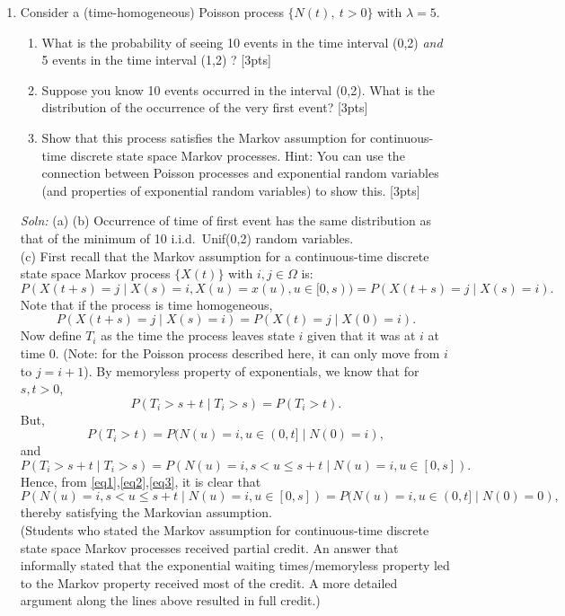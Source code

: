 \documentclass[12pt]{article}
\begin{document}
\begin{enumerate}
\item Consider a (time-homogeneous) Poisson process $\{N(t),\:t>0\}$ with $\lambda=5$. 
\begin{enumerate}
\item What is the probability of seeing 10 events in the time interval (0,2) {\it and} 5 events in the time interval (1,2) ? [3pts]
\item Suppose you know 10 events occurred in the interval (0,2). What is the distribution of the occurrence of the very first event? [3pts]
\item Show that this process satisfies the Markov assumption for
  continuous-time discrete state space Markov processes. Hint: You can
  use the connection between Poisson processes and exponential random
  variables (and properties of exponential random variables) to show
  this.  [3pts] 
\end{enumerate} {\it Soln:} (a)
(b) Occurrence of time of first event has the same distribution as that of the minimum of 10 i.i.d.\ Unif(0,2) random variables.\\
(c) First recall that the Markov assumption for a continuous-time
discrete state space Markov process $\{X(t)\}$ with $i,j\in\Omega$ is: $$P(X(t+s) = j \mid
X(s) = i, X(u)=x(u), u \in [0,s)) = P(X(t+s)=j \mid X(s)=i).$$
Note that if the process is time homogeneous, $$P(X(t+s)=j \mid X(s)=i) = P(X(t)=j \mid X(0)=i). $$
Now define $T_i$ as the time the process leaves state $i$ given that
it was at $i$ at time 0. (Note: for the Poisson process described
here,
it can only move from $i$ to $j = i+1$). 
By memoryless property of exponentials, we know that for $s,t >0$, 
\begin{equation}\label{eq1}
 P(T_i > s+t \mid
T_i>s) = P(T_i > t).
\end{equation}
  But, \begin{equation}\label{eq2}
 P(T_i > t) = P(N(u)= i, u\in(0,t] \mid N(0)=i), 
 \end{equation}
 and 
 \begin{equation}\label{eq3}
 P(T_i > s+t \mid T_i > s) = P(N(u)=i,s<u\leq s+t \mid N(u)=i, u\in [0,s]).
 \end{equation}
 Hence, from \eqref{eq1},\eqref{eq2},\eqref{eq3}, it is
  clear that $$P(N(u)=i, s<u\leq s+t \mid N(u)=i, u\in [0,s]) =
  P(N(u)= i, u\in (0,t] \mid N(0)=0),$$
  thereby satisfying the Markovian
  assumption.\\
(Students who stated the Markov assumption for continuous-time discrete state space Markov processes received partial credit. An answer that informally stated that the exponential waiting times/memoryless property led to the Markov property received most of the credit.  A more detailed argument along the lines above resulted in full credit.)


\end{enumerate}
\end{document}

